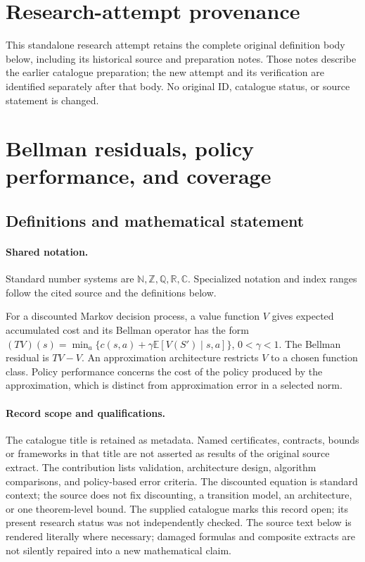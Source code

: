 \documentclass[11pt]{article}
\begin{document}
\section*{Research-attempt provenance}
This standalone research attempt retains the complete original definition body below,
including its historical source and preparation notes. Those notes describe the
earlier catalogue preparation; the new attempt and its verification are identified
separately after that body. No original ID, catalogue status, or source statement is changed.

\section{Bellman residuals, policy performance, and coverage}\label{statement}

\subsection{Definitions and mathematical statement}

\paragraph{Shared notation.}Standard number systems are $\mathbb N,\mathbb Z,\mathbb Q,\mathbb R,\mathbb C$. Specialized notation and index ranges follow the cited source and the definitions below.


For a discounted Markov decision process, a value function $V$ gives expected accumulated cost and its Bellman operator has the form $(TV)(s)=\min_a\{c(s,a)+\gamma\mathbb E[V(S')\mid s,a]\}$, $0<\gamma<1$. The Bellman residual is $TV-V$. An approximation architecture restricts $V$ to a chosen function class. Policy performance concerns the cost of the policy produced by the approximation, which is distinct from approximation error in a selected norm.
\paragraph{Record scope and qualifications.}
The catalogue title is retained as metadata. Named certificates, contracts, bounds or frameworks in that title are not asserted as results of the original source extract.
The contribution lists validation, architecture design, algorithm comparisons, and policy-based error criteria. The discounted equation is standard context; the source does not fix discounting, a transition model, an architecture, or one theorem-level bound. The supplied catalogue marks this record open; its present research status was not independently checked.
The source text below is rendered literally where necessary; damaged formulas and composite extracts are not silently repaired into a new mathematical claim.
\end{document}
